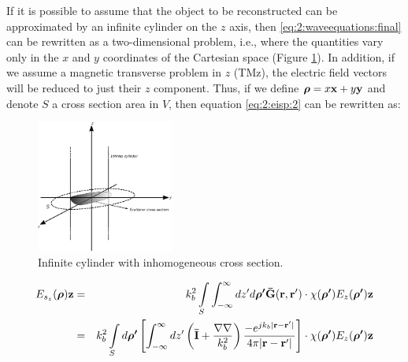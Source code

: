 			If it is possible to assume that the object to be reconstructed can be approximated by an infinite cylinder on the $z$ axis, then \eqref{eq:2:waveequations:final} can be rewritten as a two-dimensional problem, i.e., where the quantities vary only in the $x$ and $y$ coordinates of the Cartesian space (Figure \ref{fig:2:2dproblem}). In addition, if we assume a magnetic transverse problem in $z$ (TMz), the electric field vectors will be reduced to just their $z$ component. Thus, if we define $\boldsymbol{\rho} = x\mathbf{x} + y\mathbf{y}$ and denote $S$ a cross section area in $V$, then equation \eqref{eq:2:eisp:2} can be rewritten as:
			\begin{figure}[!htb]
				\centering
				\includegraphics[width=0.4\textwidth]{./figuras/2dproblem}
				\caption{Infinite cylinder with inhomogeneous cross section.}
				\label{fig:2:2dproblem}
			\end{figure}
			\begin{eqnarray}
				E_{s_z}(\boldsymbol{\rho})\mathbf{z} &=& k_b^2 \int\limits_S\int_{-\infty}^{\infty}dz^\prime d\boldsymbol{\rho^\prime}\mathbf{\bar{G}}(\mathbf{r},\mathbf{r^\prime})\cdot\chi(\boldsymbol{\rho^\prime})E_z(\boldsymbol{\rho^\prime})\mathbf{z} \label{eq:2:2d:1} \\
				&=& k_b^2 \int\limits_S d\boldsymbol{\rho^\prime} \left[\int_{-\infty}^{\infty}dz^\prime\left(\mathbf{\bar{I}} + \frac{\nabla\nabla}{k_b^2}\right) \frac{-e^{jk_b|\mathbf{r}-\mathbf{r^\prime}|}}{4\pi|\mathbf{r}-\mathbf{r^\prime}|} \right]  \cdot\chi(\boldsymbol{\rho^\prime})E_z(\boldsymbol{\rho^\prime})\mathbf{z} \label{eq:2:2d:2}
			\end{eqnarray}
	
